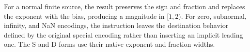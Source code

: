 For a normal finite source, the result preserves the sign and fraction and replaces the exponent with the bias, producing a magnitude in \([1,2)\). For zero, subnormal, infinity, and NaN encodings, the instruction leaves the destination behavior defined by the original special encoding rather than inserting an implicit leading one. The S and D forms use their native exponent and fraction widths.
